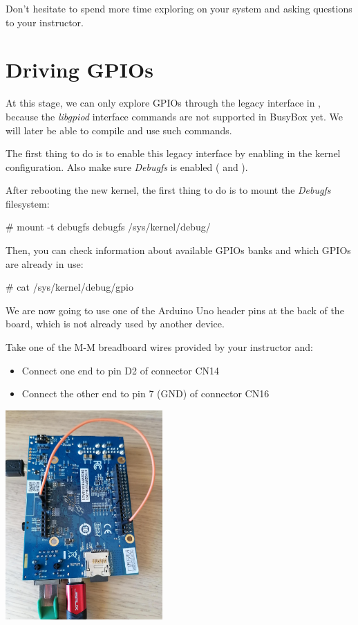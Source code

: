 Don't hesitate to spend more time exploring  on your system
and asking questions to your instructor.

\section{Driving GPIOs}

At this stage, we can only explore GPIOs through the legacy interface
in , because the {\em libgpiod} interface commands
are not supported in BusyBox yet. We will later be able to compile and
use such commands.

The first thing to do is to enable this legacy interface by enabling
 in the kernel configuration. Also make sure
{\em Debugfs} is enabled ( and
).

After rebooting the new kernel, the first thing to do is to mount
the {\em Debugfs} filesystem:

\begin{bashinput}
# mount -t debugfs debugfs /sys/kernel/debug/
\end{bashinput}

Then, you can check information about available GPIOs banks and which
GPIOs are already in use:

\begin{bashinput}
# cat /sys/kernel/debug/gpio
\end{bashinput}

We are now going to use one of the Arduino Uno header pins at the back
of the board, which is not already used by another device.

Take one of the M-M breadboard wires provided by your instructor and:
\begin{itemize}
  \item Connect one end to pin D2 of connector CN14
  \item Connect the other end to pin 7 (GND) of connector CN16
\end{itemize}

\includegraphics[width=6cm]{labs/sysdev-accessing-hardware/dk1-board-gpio-connected-to-gnd.jpg}

